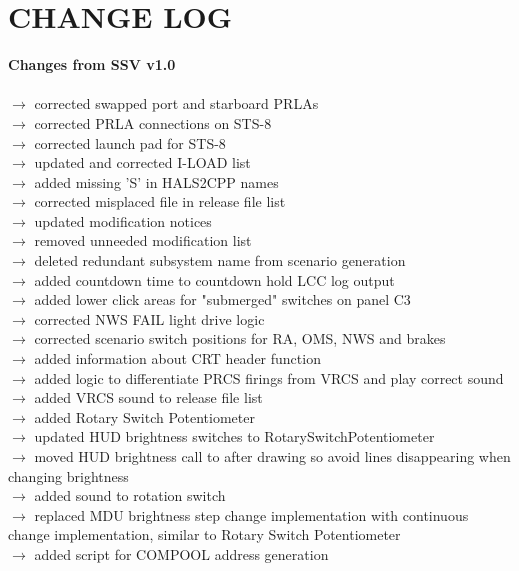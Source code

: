 \documentclass[Space_Shuttle_Vessel_Manual.tex]{subfiles}
\begin{document}
\section{CHANGE LOG}
\label{sec:change-log}
\noindent
\textbf{Changes from SSV v1.0}\\\\
$\rightarrow$ corrected swapped port and starboard PRLAs\\
$\rightarrow$ corrected PRLA connections on STS-8\\
$\rightarrow$ corrected launch pad for STS-8\\
$\rightarrow$ updated and corrected I-LOAD list\\
$\rightarrow$ added missing 'S' in HALS2CPP names\\
$\rightarrow$ corrected misplaced file in release file list\\
$\rightarrow$ updated modification notices\\
$\rightarrow$ removed unneeded modification list\\
$\rightarrow$ deleted redundant subsystem name from scenario generation\\
$\rightarrow$ added countdown time to countdown hold LCC log output\\
$\rightarrow$ added lower click areas for "submerged" switches on panel C3\\
$\rightarrow$ corrected NWS FAIL light drive logic\\
$\rightarrow$ corrected scenario switch positions for RA, OMS, NWS and brakes\\
$\rightarrow$ added information about CRT header function\\
$\rightarrow$ added logic to differentiate PRCS firings from VRCS and play correct sound\\
$\rightarrow$ added VRCS sound to release file list\\
$\rightarrow$ added Rotary Switch Potentiometer\\
$\rightarrow$ updated HUD brightness switches to RotarySwitchPotentiometer\\
$\rightarrow$ moved HUD brightness call to after drawing so avoid lines disappearing when changing brightness\\
$\rightarrow$ added sound to rotation switch\\
$\rightarrow$ replaced MDU brightness step change implementation with continuous change implementation, similar to Rotary Switch Potentiometer\\
$\rightarrow$ added script for COMPOOL address generation\\
\end{document}
